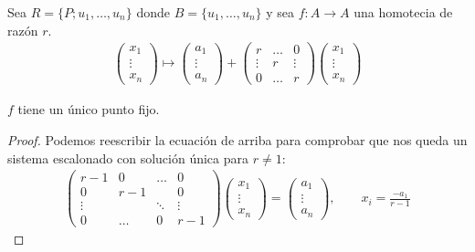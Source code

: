 \documentclass[14pt]{book}
\begin{document}
Sea $R = \{ P; u_1, \dots, u_n\}$ donde $B= \{u_1, \dots, u_n\}$ y sea $f: A \to A$ una homotecia de razón $r$.
\begin{align*}
	\left(\begin{array}{c}
	x_1 \\ \vdots \\ x_n
	\end{array}\right) \mapsto
	\left(\begin{array}{c}
	a_1 \\ \vdots \\ a_n
	\end{array}\right) + 
	\left(\begin{array}{ccc}
	r & \dots & 0 \\ \vdots & r & \vdots \\ 0 & \dots & r
	\end{array}\right)
	\left(\begin{array}{c}
	x_1 \\ \vdots \\ x_n
	\end{array}\right)
\end{align*}

\begin{pro}
	$f$ tiene un único punto fijo.
\end{pro}

\begin{proof}
	Podemos reescribir la ecuación de arriba para comprobar que nos queda un sistema escalonado con solución única para $r ≠ 1$:
	\begin{align*}
		\left(\begin{array}{cccc}
		r-1 & 0 & \dots & 0 \\
		0 & r-1 &  & 0 \\
		\vdots & & \ddots & \vdots \\
		0 & \dots & 0 & r - 1
		\end{array}\right)\left(\begin{array}{c}
		x_1 \\ \vdots \\ x_n
		\end{array}\right) = \left(
			\begin{array}{c}
			a_1 \\ \vdots \\ a_n
			\end{array}
		\right), \qquad x_i = \frac{-a_1}{r-1}
	\end{align*}
\end{proof}
\end{document}

